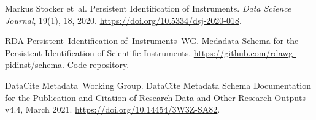 \documentclass[titlepage=true,twoside=false,DIV=13]{scrartcl}
\begin{document}
%
%
\begin{thebibliography}{1}

Markus Stocker et~al.
\newblock Persistent Identification of Instruments.
\newblock \emph{Data Science Journal}, 19(1), 18, 2020.
\newblock \url{https://doi.org/10.5334/dsj-2020-018}.

RDA Persistent~Identification of~Instruments~WG.
\newblock Medadata Schema for the Persistent Identification of Scientific
  Instruments.
\newblock \url{https://github.com/rdawg-pidinst/schema}.
\newblock Code repository.

DataCite Metadata~Working Group.
\newblock DataCite Metadata Schema Documentation for the Publication and
  Citation of Research Data and Other Research Outputs v4.4, March 2021.
\newblock \url{https://doi.org/10.14454/3W3Z-SA82}.

\end{thebibliography}
\end{document}
